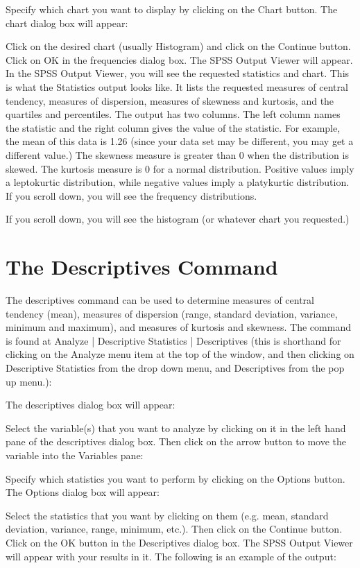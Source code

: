 Specify which chart you want to display by clicking on the Chart button. The chart dialog box will appear:

Click on the desired chart (usually Histogram) and click on the Continue button.
Click on OK in the frequencies dialog box. The SPSS Output Viewer will appear.
In the SPSS Output Viewer, you will see the requested statistics and chart. This is what the Statistics output looks like. It lists the requested measures of central tendency, measures of dispersion, measures of skewness and kurtosis, and the quartiles and percentiles.
	The output has two columns. The left column names the statistic and the right column gives the value of the statistic. For example, the mean of this data is 1.26 (since your data set may be different, you may get a different value.)
The skewness measure is greater than 0 when the distribution is skewed.
The kurtosis measure is 0 for a normal distribution. Positive values imply a leptokurtic distribution, while negative values imply a platykurtic distribution.
If you scroll down, you will see the frequency distributions.

If you scroll down, you will see the histogram (or whatever chart you requested.)


\section{The Descriptives Command}

The descriptives command can be used to determine measures of central tendency (mean), measures of dispersion (range, standard deviation, variance, minimum and maximum), and measures of kurtosis and skewness. The command is found at Analyze | Descriptive Statistics | Descriptives (this is shorthand for clicking on the Analyze menu item at the top of the window, and then clicking on Descriptive Statistics from the drop down menu, and Descriptives from the pop up menu.):

The descriptives dialog box will appear:

Select the variable(s) that you want to analyze by clicking on it in the left hand pane of the descriptives dialog box. Then click on the arrow button to move the variable into the Variables pane:

Specify which statistics you want to perform by clicking on the Options button. The Options dialog box will appear:

Select the statistics that you want by clicking on them (e.g. mean, standard deviation, variance, range, minimum, etc.). Then click on the Continue button. Click on the OK button in the Descriptives dialog box. The SPSS Output Viewer will appear with your results in it. The following is an example of the output:

